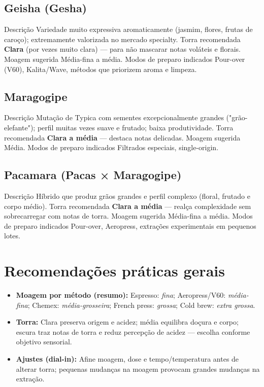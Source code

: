 \documentclass[a4paper,12pt]{article}
\begin{document}
\subsection{Geisha (Gesha)}
{Descrição} Variedade muito expressiva aromaticamente (jasmim, flores, frutas de caroço); extremamente valorizada no mercado specialty.  
{Torra recomendada} \textbf{Clara} (por vezes muito clara) — para não mascarar notas voláteis e florais.  
{Moagem sugerida} Média-fina a média.  
{Modos de preparo indicados} Pour-over (V60), Kalita/Wave, métodos que priorizem aroma e limpeza.

\subsection{Maragogipe}
{Descrição} Mutação de Typica com sementes excepcionalmente grandes ("grão-elefante"); perfil muitas vezes suave e frutado; baixa produtividade.  
{Torra recomendada} \textbf{Clara a média} — destaca notas delicadas.  
{Moagem sugerida} Média.  
{Modos de preparo indicados} Filtrados especiais, single-origin.

\subsection{Pacamara (Pacas × Maragogipe)}
{Descrição} Híbrido que produz grãos grandes e perfil complexo (floral, frutado e corpo médio).  
{Torra recomendada} \textbf{Clara a média} — realça complexidade sem sobrecarregar com notas de torra.  
{Moagem sugerida} Média-fina a média.  
{Modos de preparo indicados} Pour-over, Aeropress, extrações experimentais em pequenos lotes.

\section{Recomendações práticas gerais}
\begin{itemize}
  \item \textbf{Moagem por método (resumo):} Espresso: \emph{fina}; Aeropress/V60: \emph{média-fina}; Chemex: \emph{média-grosseira}; French press: \emph{grossa}; Cold brew: \emph{extra grossa}.
  \item \textbf{Torra:} Clara preserva origem e acidez; média equilibra doçura e corpo; escura traz notas de torra e reduz percepção de acidez — escolha conforme objetivo sensorial.
  \item \textbf{Ajustes (dial-in):} Afine moagem, dose e tempo/temperatura antes de alterar torra; pequenas mudanças na moagem provocam grandes mudanças na extração.
\end{itemize}
\end{document}
